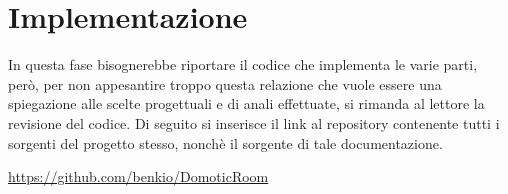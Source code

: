 \section{Implementazione}

In questa fase bisognerebbe riportare il codice che implementa le varie parti, per\`o, per non appesantire troppo questa relazione che vuole essere una spiegazione alle scelte progettuali e di anali effettuate, si rimanda al lettore la revisione del codice. Di seguito si inserisce il link al repository contenente tutti i sorgenti del progetto stesso, nonch\`e il sorgente di tale documentazione.

\url{https://github.com/benkio/DomoticRoom}
